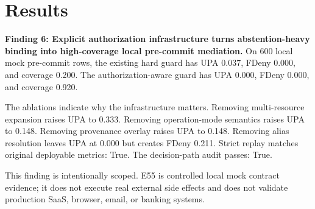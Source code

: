 \section{Results}
\textbf{Finding 6: Explicit authorization infrastructure turns abstention-heavy binding into high-coverage local pre-commit mediation.} On 600 local mock pre-commit rows, the existing hard guard has UPA 0.037, FDeny 0.000, and coverage 0.200. The authorization-aware guard has UPA 0.000, FDeny 0.000, and coverage 0.920.

The ablations indicate why the infrastructure matters. Removing multi-resource expansion raises UPA to 0.333. Removing operation-mode semantics raises UPA to 0.148. Removing provenance overlay raises UPA to 0.148. Removing alias resolution leaves UPA at 0.000 but creates FDeny 0.211. Strict replay matches original deployable metrics: True. The decision-path audit passes: True.

This finding is intentionally scoped. E55 is controlled local mock contract evidence; it does not execute real external side effects and does not validate production SaaS, browser, email, or banking systems.
